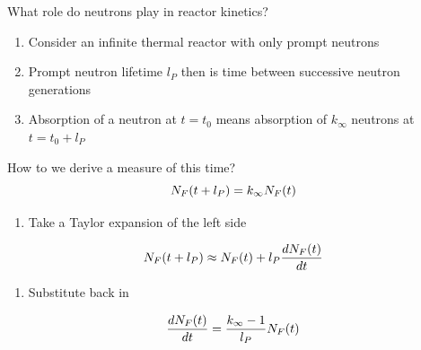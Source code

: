 \documentclass[aspectratio=1610,pdftex,dvipsnames,compress,xcolor={dvipsnames}]{beamer}
\begin{document}
\begin{frame}{What role do neutrons play in reactor kinetics?}
    \begin{enumerate}[series=outerlist,topsep=0pt,itemsep=21pt,leftmargin=*,label=(\arabic*)]
        \item[]Consider an infinite thermal reactor with only prompt neutrons
        \item[]Prompt neutron lifetime $l_P$ then is time between successive neutron generations
        \item[]Absorption of a neutron at $t=t_0$ means absorption of $k_\infty$ neutrons at $t=t_0+l_P$
    \end{enumerate}
\end{frame}


\begin{frame}{How to we derive a measure of this time?}
    \begin{equation}
        \LARGE
        N_F(t + l_P) = k_\infty N_F(t)
    \end{equation}

    \vspace*{\fill}

    \begin{enumerate}[series=outerlist,topsep=0pt,itemsep=21pt,leftmargin=*,label=(\arabic*)]
        \item[]Take a Taylor expansion of the left side
    \end{enumerate}

    \vspace*{\fill}

    \begin{equation}
        \LARGE
        N_F(t + l_P) \approx N_F(t) + l_P\frac{dN_F(t)}{dt}
    \end{equation}

    \vspace*{\fill}

    \begin{enumerate}[series=outerlist,topsep=0pt,itemsep=21pt,leftmargin=*,label=(\arabic*)]
        \item[]Substitute back in
    \end{enumerate}

    \vspace*{\fill}

    \begin{equation}
        \LARGE
        \frac{dN_F(t)}{dt} = \frac{k_\infty - 1}{l_P}N_F(t)
    \end{equation}
\end{frame}
\end{document}

